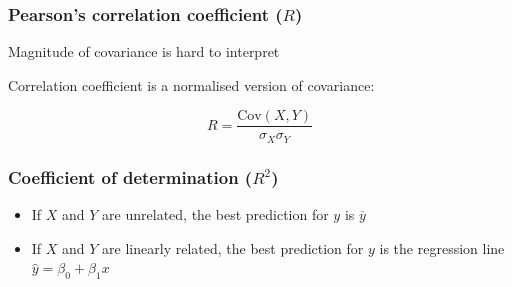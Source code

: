 \documentclass{beamer}
\begin{document}
\begin{frame}
  \frametitle{Pearson's correlation coefficient ($R$)}

  Magnitude of covariance is hard to interpret
  
  Correlation coefficient is a normalised version of covariance:
  
  \[R = \frac{\mathrm{Cov}(X,Y)}{\sigma_{X}\sigma_{Y}}\]
  

\end{frame}

\begin{frame}
  \frametitle{Coefficient of determination ($R^2$)}

  
  \begin{itemize}
    \item If $X$ and $Y$ are unrelated, the best prediction for $y$ is $\overline{y}$
    \item If $X$ and $Y$ are linearly related, the best prediction for $y$ is the regression line $\hat{y} = \beta_0 + \beta_1 x$
  \end{itemize}
\end{frame}
\end{document}
